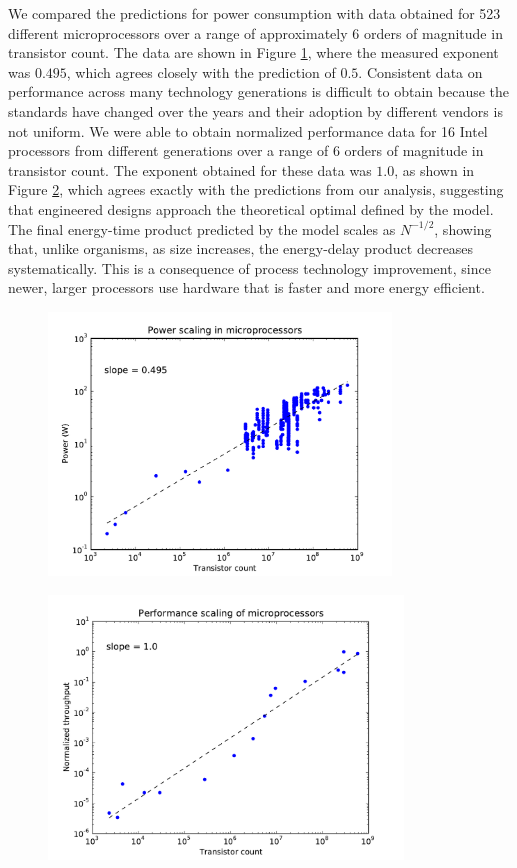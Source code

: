 \documentclass[12pt]{article}
\begin{document}
We compared the predictions for power consumption with data obtained 
for 523 different microprocessors over a range of approximately 6 
orders of magnitude in transistor count.  The data are shown in Figure 
\ref{fig:power}, where the measured exponent was $0.495$, which agrees 
closely with the prediction of $0.5$. Consistent data on performance 
across many technology generations is difficult to obtain because the 
standards have changed over the years and their adoption by different 
vendors is not uniform.  We were able to obtain normalized performance 
data for 16 Intel processors from different generations over a range 
of 6 orders of magnitude in transistor count.  The exponent obtained 
for these data was $1.0$, as shown in Figure \ref{fig:throughput}, 
which agrees exactly with the predictions from our analysis, 
suggesting that engineered designs approach the theoretical optimal 
defined by the model.  The final energy-time product predicted by the 
model scales as $N^{-1/2}$, showing that, unlike organisms, as size 
increases, the energy-delay product decreases systematically. This is 
a consequence of process technology improvement, since newer, larger 
processors use hardware that is faster and more energy efficient.

\begin{figure}[!h]
\centering
\includegraphics[height=70mm]{Figures/power_scaling.pdf}
\caption{ }
\label{fig:power}
\end{figure}

\begin{figure}[!h]
\centering
\includegraphics[height=70mm]{Figures/throughput_scaling.pdf}
\caption{ }
\label{fig:throughput}
\end{figure}
\end{document}

